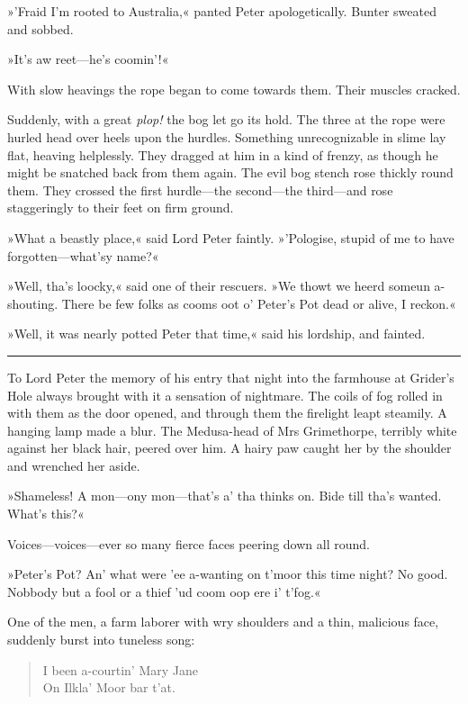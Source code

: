 »'Fraid I'm rooted to Australia,« panted Peter apologetically. Bunter sweated and sobbed.

»It's aw reet—he's coomin'!«

With slow heavings the rope began to come towards them. Their muscles cracked.

Suddenly, with a great \textit{plop!} the bog let go its hold. The three at the rope were hurled head over heels upon the hurdles. Something unrecognizable in slime lay flat, heaving helplessly. They dragged at him in a kind of frenzy, as though he might be snatched back from them again. The evil bog stench rose thickly round them. They crossed the first hurdle—the second—the third—and rose staggeringly to their feet on firm ground.

»What a beastly place,« said Lord Peter faintly. »'Pologise, stupid of me to have forgotten—what'sy name?«

»Well, tha's loocky,« said one of their rescuers. »We thowt we heerd someun a-shouting. There be few folks as cooms oot o' Peter's Pot dead or alive, I reckon.«

»Well, it was nearly potted Peter that time,« said his lordship, and fainted. 

\noindent\hfil\rule{0.5\textwidth}{.4pt}\hfil 

To Lord Peter the memory of his entry that night into the farmhouse at Grider's Hole always brought with it a sensation of nightmare.  The coils of fog rolled in with them as the door opened, and through them the firelight leapt steamily. A hanging lamp made a blur. The Medusa-head of Mrs Grimethorpe, terribly white against her black hair, peered over him. A hairy paw caught her by the shoulder and wrenched her aside.

»Shameless! A mon—ony mon—that's a' tha thinks on. Bide till tha's wanted. What's this?«

Voices—voices—ever so many fierce faces peering down all round.

»Peter's Pot? An' what were 'ee a-wanting on t'moor this time night? No good. Nobbody but a fool or a thief 'ud coom oop ere i' t'fog.«

One of the men, a farm laborer with wry shoulders and a thin, malicious face, suddenly burst into tuneless song: 
\begin{samepage}
\begin{verse}
\begin{altverse}
I been a-courtin' Mary Jane\\
On Ilkla' Moor bar t'at.\\
\end{altverse}
\end{verse}
\end{samepage}


